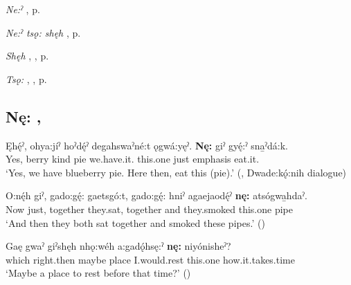 \begin{CayugaRelated}
\item \textit{Ne:ˀ} , p. \pageref{p:[ne:ˀ] `it is’}\\
\item \textit{Ne:ˀ tsǫ: shęh} , p. \pageref{p:[ne:ˀ tsǫ: shęh]}\\
\item \textit{Shęh} , , p. \pageref{p:[shęh] `because’}\\
\item \textit{Tsǫ:} , , p. \pageref{p:[tsǫ:]}
\end{CayugaRelated}

\subsection*{\textbf{Nę:} , } \label{p:[nę:] ‘this, these’}

\ea
\label{ex:npar98}
\gll Ęhę́ˀ, ohya:jíˀ hoˀdę́ˀ degahswaˀné:t ǫgwá:yęˀ. \textbf{Nę:} giˀ gyę́:ˀ sna̱ˀdá:k. \\
Yes, berry kind pie we.have.it. this.one just emphasis eat.it. \\
\glt ‘Yes, we have blueberry pie. Here then, eat this (pie).’ (\cite[294]{mithun_watewayestanih_1984}, Dwade:kǫ́:nih dialogue)
\z

\ea
\label{ex:npar99}
\gll O:nę́h giˀ, gado:gę́: gaetsgó:t, gado:gę́: hniˀ agaejaodę́ˀ \textbf{nę:} atsógwa̱hdaˀ. \\
Now just, together they.sat, together and they.smoked this.one pipe\\
\glt ‘And then they both sat together and smoked these pipes.’ (\cite{henry_de_2005})
\z

\ea
\label{ex:npar100}
\gll Gaę gwaˀ giˀshęh nhǫ:wéh a:gadǫ́hsę:ˀ \textbf{nę:} niyónisheˀ? \\
which right.then maybe place I.would.rest this.one how.it.takes.time\\
\glt ‘Maybe a place to rest before that time?’ (\cite{carrier_legends_2013})
\z

